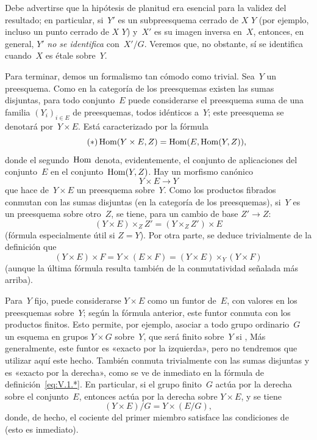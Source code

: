 Debe advertirse que la hipótesis de planitud era esencial para la validez
del resultado; en particular, si~$Y'$ es un subpreesquema cerrado de
{$X$}
{$Y$}
(por ejemplo, incluso un punto cerrado de
{$X$}
{$Y$})
y~$X'$ es su imagen inversa en~$X$, entonces, en general, $Y'$ \emph{no se
identifica} con~$X'/G$. Veremos que, no obstante, sí se identifica cuando~$X$
es étale sobre~$Y$.

Para terminar, demos un formalismo tan cómodo como trivial. Sea~$Y$ un
preesquema. Como en la categoría de los preesquemas existen las sumas
disjuntas, para todo conjunto~$E$ puede considerarse el preesquema suma de
una familia $(Y_i)_{i\in E}$ de preesquemas, todos idénticos a~$Y$; este
preesquema se denotará por~$Y\times E$.
Está caracterizado por la fórmula
\begin{equation*}
\label{eq:V.1.*}
\tag{$*$} \operatorname{Hom}(Y\times E,Z) = \operatorname{Hom}(E,\operatorname{Hom}(Y,Z)),
\end{equation*}
donde el segundo~$\operatorname{Hom}$ denota, evidentemente, el conjunto de aplicaciones
del conjunto~$E$ en el conjunto~$\operatorname{Hom}(Y,Z)$. Hay un morfismo canónico
$$
Y\times E\to Y
$$
que hace de~$Y\times E$ un preesquema sobre~$Y$. Como los productos fibrados
conmutan con las sumas disjuntas (en la categoría de los preesquemas), si~$Y$
es un preesquema sobre otro~$Z$, se tiene, para un cambio de base $Z'\to Z$:
$$
(Y\times E)\times_Z Z'=(Y\times_Z Z')\times E
$$
(fórmula especialmente útil si $Z=Y$). Por otra parte, se deduce
trivialmente de la definición que
$$
(Y\times E)\times F=Y\times(E\times F)
=(Y\times E)\times_Y(Y\times F)
$$
(aunque la última fórmula resulta también de la conmutatividad señalada más
arriba).

Para~$Y$ fijo, puede considerarse $Y\times E$ como un funtor de~$E$, con
valores en los preesquemas sobre~$Y$; según la fórmula anterior, este funtor
conmuta con los productos finitos. Esto permite, por ejemplo, asociar a todo
grupo ordinario~$G$ un esquema en grupos $Y\times G$ sobre~$Y$, que será
finito sobre~$Y$ si
,
Más generalmente, este funtor es «exacto por la izquierda», pero no tendremos
que utilizar aquí este hecho. También conmuta trivialmente con las sumas
disjuntas y es «exacto por la derecha», como se ve de inmediato en la fórmula
de definición~\eqref{eq:V.1.*}. En particular, si el grupo finito~$G$ actúa
por la derecha sobre el conjunto~$E$, entonces actúa por la derecha sobre
$Y\times E$, y se tiene
$$
(Y\times E)/G = Y\times (E/G),
$$
donde, de hecho, el cociente del primer miembro satisface las condiciones
de~ (esto es inmediato).
